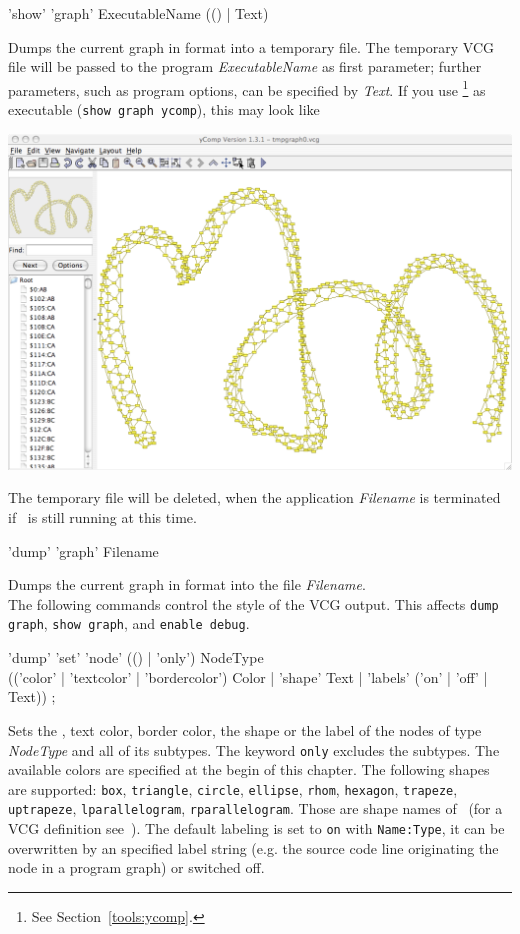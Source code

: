 \begin{rail}
  'show' 'graph' ExecutableName (() | Text)
\end{rail}
Dumps the current graph in  format into a temporary file.
The temporary VCG file will be passed to the program \emph{ExecutableName} as first parameter;
further parameters, such as program options, can be specified by \emph{Text}.
If you use \yComp\footnote{See Section~\ref{tools:ycomp}.} as executable (\texttt{show graph ycomp}), this may look like
\begin{center}
  \includegraphics[width=0.75\linewidth]{fig/showgraph}
\end{center}  
The temporary file will be deleted, when the application \emph{Filename} is terminated if \GrShell\ is still running at this time.

\begin{rail}
  'dump' 'graph' Filename
\end{rail}
Dumps the current graph in  format into the file \emph{Filename}.\\

The following commands control the style of the VCG output. This affects \texttt{dump graph}, \texttt{show graph}, and \texttt{enable debug}. 
\begin{rail}
  'dump' 'set' 'node' (() | 'only') NodeType \\ (('color' | 'textcolor' | 'bordercolor') Color | 'shape' Text | 'labels' ('on' | 'off' | Text)) ;
\end{rail}
Sets the , text color, border color, the shape or the label of the nodes of type \emph{NodeType} and all of its subtypes.
The keyword \texttt{only} excludes the subtypes. The available colors are specified at the begin of this chapter. 
The following shapes are supported: \texttt{box}, \texttt{triangle}, \texttt{circle}, \texttt{ellipse}, \texttt{rhom}, \texttt{hexagon}, \texttt{trapeze}, \texttt{uptrapeze}, \texttt{lparallelogram}, \texttt{rparallelogram}.
Those are shape names of \yComp\ (for a VCG definition see~\cite{vcg}).
The default labeling is set to \texttt{on} with \texttt{Name:Type}, it can be overwritten by an specified label string (e.g. the source code line originating the node in a program graph) or switched off.

